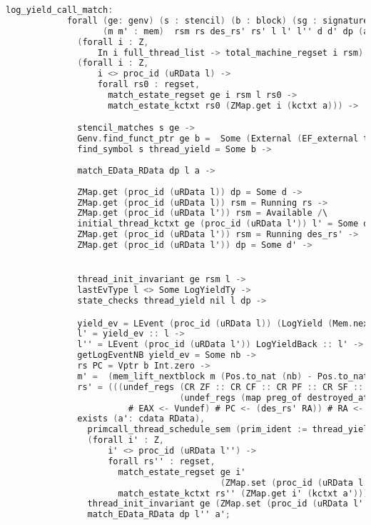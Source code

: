 \begin{lstlisting}[language=C]     
          log_yield_call_match:
            forall (ge: genv) (s : stencil) (b : block) (sg : signature) 
                   (m m' : mem)  rsm rs des_rs' rs' l l' l'' d d' dp (a: cdata RData) nb yield_ev,
              (forall i : Z,
                  In i full_thread_list -> total_machine_regset i rsm) ->
              (forall i : Z,
                  i <> proc_id (uRData l) ->
                  forall rs0 : regset,
                    match_estate_regset ge i rsm l rs0 ->
                    match_estate_kctxt rs0 (ZMap.get i (kctxt a))) ->

              stencil_matches s ge ->
              Genv.find_funct_ptr ge b =  Some (External (EF_external thread_yield sg)) ->
              find_symbol s thread_yield = Some b ->
              
              match_EData_RData dp l a ->
              
              ZMap.get (proc_id (uRData l)) dp = Some d ->
              ZMap.get (proc_id (uRData l)) rsm = Running rs ->
              ZMap.get (proc_id (uRData l')) rsm = Available /\
              initial_thread_kctxt ge (proc_id (uRData l')) l' = Some des_rs' \/
              ZMap.get (proc_id (uRData l')) rsm = Running des_rs' ->
              ZMap.get (proc_id (uRData l')) dp = Some d' ->


              thread_init_invariant ge rsm l ->
              lastEvType l <> Some LogYieldTy ->
              state_checks thread_yield nil l dp ->

              yield_ev = LEvent (proc_id (uRData l)) (LogYield (Mem.nextblock m)) ->
              l' = yield_ev :: l ->
              l'' = LEvent (proc_id (uRData l')) LogYieldBack :: l' ->
              getLogEventNB yield_ev = Some nb ->
              rs PC = Vptr b Int.zero ->
              m' =  (mem_lift_nextblock m (Pos.to_nat (nb) - Pos.to_nat (Mem.nextblock m) % nat)) ->
              rs' = (((undef_regs (CR ZF :: CR CF :: CR PF :: CR SF :: CR OF :: nil)
                                  (undef_regs (map preg_of destroyed_at_call) des_rs'))
                        # EAX <- Vundef) # PC <- (des_rs' RA)) # RA <- Vundef ->
              exists (a': cdata RData),
                primcall_thread_schedule_sem (prim_ident := thread_yield) big_thread_yield_spec s rs (m, a) rs' (m', a') /\
                (forall i' : Z,
                    i' <> proc_id (uRData l'') ->
                    forall rs'' : regset,
                      match_estate_regset ge i'
                                          (ZMap.set (proc_id (uRData l'')) (Running rs') rsm) l'' rs'' ->
                      match_estate_kctxt rs'' (ZMap.get i' (kctxt a'))) /\
                thread_init_invariant ge (ZMap.set (proc_id (uRData l'')) (Running rs') rsm) l'' /\
                match_EData_RData dp l'' a';
\end{lstlisting}
         
